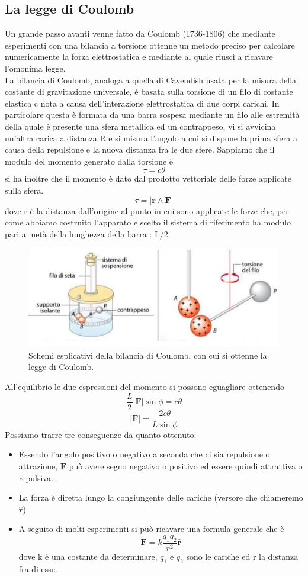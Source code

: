 \documentclass[
10pt, %
a4paper, %
oneside, %
headinclude,footinclude, %
BCOR5mm, %
]{scrartcl}
\begin{document}
\subsection{La legge di Coulomb}
Un grande passo avanti venne fatto da Coulomb (1736-1806) che mediante esperimenti con una bilancia a torsione ottenne un metodo preciso per calcolare numericamente la forza elettrostatica e mediante al quale riuscì a ricavare l'omonima legge.\\
La bilancia di Coulomb, analoga a quella di Cavendish usata per la misura della costante di gravitazione universale, è basata sulla torsione di un filo di costante elastica c nota a causa dell'interazione elettrostatica di due corpi carichi. In particolare questa è formata da una barra sospesa mediante un filo alle estremità della quale è presente una sfera metallica ed un contrappeso, vi si avvicina un'altra carica a distanza R e si misura l'angolo a cui si dispone la prima sfera a causa della repulsione e la nuova distanza fra le due sfere. Sappiamo che il modulo del momento generato dalla torsione è
\[\tau = c\theta\]
si ha inoltre che il momento è dato dal prodotto vettoriale delle forze applicate sulla sfera.
\[\tau = |\mathbf{r}\wedge \mathbf{F}|\]
dove r è la distanza dall'origine al punto in cui sono applicate le forze che, per come abbiamo costruito l'apparato e scelto il sistema di riferimento ha modulo pari a metà della lunghezza della barra : L/2. 
\begin{figure}[h!]
	\centering
	\includegraphics[width=0.6\linewidth]{images/bilancia_coulomb}
	\caption{Schemi esplicativi della bilancia di Coulomb, con cui si ottenne la legge di Coulomb.}
	\label{fig:bilanciacoulomb}
\end{figure}
\FloatBarrier
All'equilibrio le due espressioni del momento si possono eguagliare ottenendo 
\[\frac{L}{2}|\mathbf{F}|\sin\phi = c\theta\]
\[|\mathbf{F}| = \frac{2c\theta}{L\sin\phi}\] 
Possiamo trarre tre conseguenze da quanto ottenuto:
\begin{itemize}
	\item Essendo l'angolo positivo o negativo a seconda che ci sia repulsione o attrazione, $\mathbf{F}$ può avere segno negativo o positivo ed essere quindi attrattiva o repulsiva. 
	\item La forza è diretta lungo la congiungente delle cariche (versore che chiameremo $\hat{\mathbf{r}}$)
	\item A seguito di molti esperimenti si può ricavare una formula generale che è 
	\[\mathbf{F} = k \frac{q_1q_2}{r^2}\hat{\mathbf{r}}\]
	dove k è una costante da determinare, \(q_1\) e \(q_2\) sono le cariche ed r la distanza fra di esse. 
\end{itemize}
\end{document}
